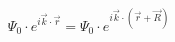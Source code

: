 \documentclass[preview]{standalone}
\begin{document}
\begin{align*}
\Psi_0 \cdot e^{i \vec{k} \cdot \vec{r}} = \Psi_0 \cdot e^{i \vec{k} \cdot (\vec{r} + \vec{R})}
\end{align*}
\end{document}

